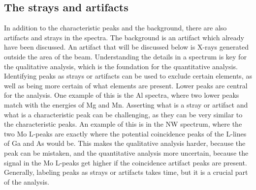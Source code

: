 






\subsection{The strays and artifacts}
\label{sec:discussion:general:strays}


In addition to the characteristic peaks and the background, there are also artifacts and strays in the spectra. %
The background is an artifact which already have been discussed.
An artifact that will be discussed below is X-rays generated outside the area of the beam.
Understanding the details in a spectrum is key for the qualitative analysis, which is the foundation for the quantitative analysis.
Identifying peaks as strays or artifacts can be used to exclude certain elements, as well as being more certain of what elements are present.
Lower peaks are central for the analysis.
One example of this is the Al spectra, where two lower peaks match with the energies of Mg and Mn.
Asserting what is a stray or artifact and what is a characteristic peak can be challenging, as they can be very similar to the characteristic peaks.
An example of this is in the NW spectrum, where the two Mo L-peaks are exactly where the potential coincidence peaks of the L-lines of Ga and As would be.
This makes the qualitative analysis harder, because the peak can be mistaken, and the quantitative analysis more uncertain, because the signal in the Mo L-peaks get higher if the coincidence artifact peaks are present.
Generally, labeling peaks as strays or artifacts takes time, but it is a crucial part of the analysis.

